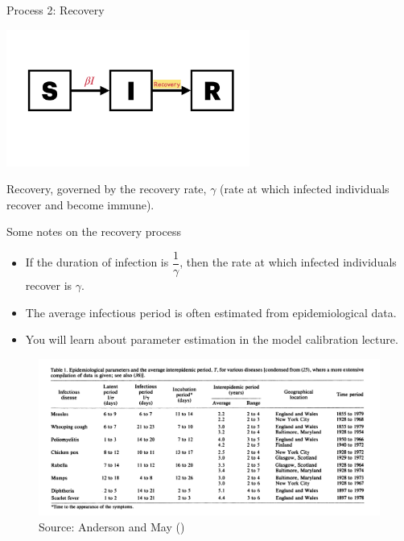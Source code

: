 \documentclass[
  ignorenonframetext,
]{beamer}
\begin{document}
\begin{frame}
\begin{block}{Process 2: Recovery}
\label{process-2-recovery}
\begin{center}
\includegraphics[width=0.6\textwidth,height=\textheight]{images/model_diagrams/model_diagrams.005.jpeg}
\end{center}

{Recovery}, governed by the recovery rate, \(\gamma\) (rate at which
infected individuals recover and become immune).
\end{block}
\end{frame}

\begin{frame}
\begin{block}{Some notes on the recovery process}
\label{some-notes-on-the-recovery-process}
\begin{itemize}
\item
  If the duration of infection is \(\dfrac{1}{\gamma}\), then the rate
  at which infected individuals recover is \(\gamma\).
\item
  The average infectious period is often {estimated from epidemiological
  data}.
\item
  You will learn about parameter estimation in the model calibration
  lecture.
\end{itemize}
\end{block}
\end{frame}

\begin{frame}
\begin{figure}[H]

{\centering \includegraphics{images/epi_parameters.png}

}

\caption{Source: Anderson and May
()}

\end{figure}%
\end{frame}
\end{document}
